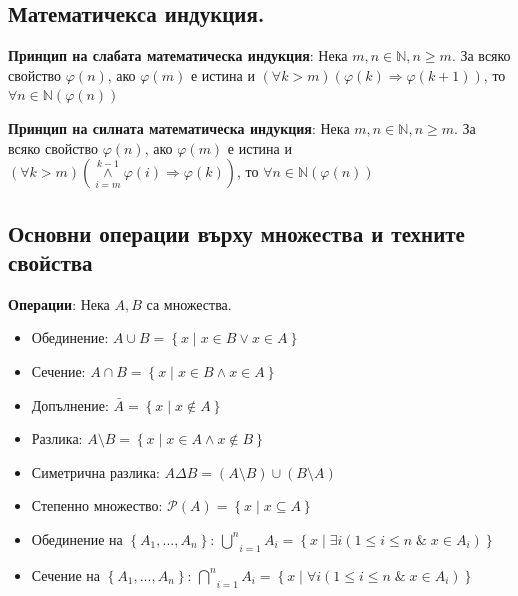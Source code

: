 \documentclass{article}
\renewcommand{\\}{\newline}
\newcommand{\amp}{\;\&\;}
\newcommand{\sep}{\;|\;}
\begin{document}
\subsection{Математичекса индукция.}

    \textbf{Принцип на слабата математическа индукция}: Нека \(m, n \in \mathbb{N}, n \geq m\). За всяко свойство \(\varphi(n)\), ако \(\varphi(m)\) е истина и \(\left( \forall k > m \right)(\varphi(k) \Rightarrow \varphi(k+1))\), то \(\forall n \in \mathbb{N} (\varphi(n))\)     

    \textbf{Принцип на силната математическа индукция}: Нека \(m, n \in \mathbb{N}, n \geq m\). За всяко свойство \(\varphi(n)\), ако \(\varphi(m)\) е истина и \(\left( \forall k > m \right)(\underset{i = m}{\overset{k-1}{\land}} \varphi(i) \Rightarrow \varphi(k))\), то \(\forall n \in \mathbb{N} (\varphi(n))\)     

\subsection{Основни операции върху множества и техните свойства }
\textbf{Операции}: Нека \(A, B\) са множества.
       \begin{itemize}
       \item Обединение: \(A \cup B = \left\{ x \sep x \in B \lor x \in A \right\}\)  
       \item Сечение: \(A \cap B = \left\{ x \sep x \in B \land x \in A \right\}\)  
       \item Допълнение: \(\bar{A} = \left\{ x \sep x \not\in A \right\} \)
       \item Разлика: \(A \setminus B = \left\{ x \sep x\in A \land x \not\in B\right\} \)
       \item Симетрична разлика: \(A \Delta B = (A \setminus B) \cup (B\setminus A)\)
       \item Степенно множество: \(\mathcal{P}(A) = \left\{ x \sep x \subseteq A \right\}\)  
       \item Обединение на \(\left\{A_1,...,A_n\right\}\): \(\underset{i=1}{\overset{n}{\bigcup}}A_i=\left\{x \sep \exists i (1 \leq i \leq n \amp x \in A_i) \right\} \)
       \item Сечение на \(\left\{A_1,...,A_n\right\}\): \(\underset{i=1}{\overset{n}{\bigcap}}A_i=\left\{x \sep \forall i (1 \leq i \leq n \amp x \in A_i) \right\}\)
        
       \end{itemize}
\end{document}
